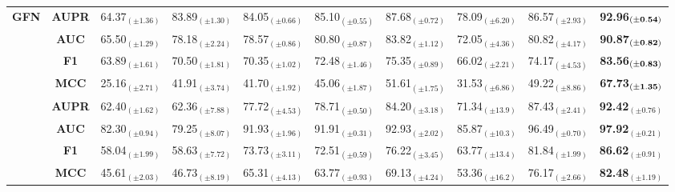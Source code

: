 \begin{table}[ht!]
\begin{tabular*}{\textwidth}{@{\extracolsep{\fill}} l |c | ccccccc | >{\columncolor{FireBrick!40}}c }
 \multirow{4}{*}{\bf GFN} & \bf AUPR & 64.37$_{(\pm1.36)}$ & 83.89$_{(\pm1.30)}$ & 84.05$_{(\pm0.66)}$ & 85.10$_{(\pm0.55)}$ & 87.68$_{(\pm0.72)}$ & 78.09$_{(\pm6.20)}$ & 86.57$_{(\pm2.93)}$ & \bf 92.96$_{(\bf\pm0.54)}$ \\
 & \bf AUC & 65.50$_{(\pm1.29)}$ & 78.18$_{(\pm2.24)}$ & 78.57$_{(\pm0.86)}$ & 80.80$_{(\pm0.87)}$ & 83.82$_{(\pm1.12)}$ & 72.05$_{(\pm4.36)}$ & 80.82$_{(\pm4.17)}$ & \bf 90.87$_{(\bf\pm0.82)}$ \\
 & \bf F1 & 63.89$_{(\pm1.61)}$ & 70.50$_{(\pm1.81)}$ & 70.35$_{(\pm1.02)}$ & 72.48$_{(\pm1.46)}$ & 75.35$_{(\pm0.89)}$ & 66.02$_{(\pm2.21)}$ & 74.17$_{(\pm4.53)}$ & \bf 83.56$_{(\bf\pm0.83)}$ \\
 & \bf MCC & 25.16$_{(\pm2.71)}$ & 41.91$_{(\pm3.74)}$ & 41.70$_{(\pm1.92)}$ & 45.06$_{(\pm1.87)}$ & 51.61$_{(\pm1.75)}$ & 31.53$_{(\pm6.86)}$ & 49.22$_{(\pm8.86)}$ & \bf 67.73$_{(\bf\pm1.35)}$ \\

\addlinespace    
\cmidrule{1-10}


 \multirow{4}{*}{\bf XC} 
 & \bf AUPR & 62.40$_{(\pm1.62)}$ & 62.36$_{(\pm7.88)}$ & 77.72$_{(\pm4.53)}$ & 78.71$_{(\pm0.50)}$ & 84.20$_{(\pm3.18)}$ & 71.34$_{(\pm13.9)}$ & 87.43$_{(\pm2.41)}$ & \bf 92.42$_{(\pm0.76)}$ \\
 & \bf AUC  & 82.30$_{(\pm0.94)}$ & 79.25$_{(\pm8.07)}$ & 91.93$_{(\pm1.96)}$ & 91.91$_{(\pm0.31)}$ & 92.93$_{(\pm2.02)}$ & 85.87$_{(\pm10.3)}$ & 96.49$_{(\pm0.70)}$ & \bf 97.92$_{(\pm0.21)}$ \\
 & \bf F1   & 58.04$_{(\pm1.99)}$ & 58.63$_{(\pm7.72)}$ & 73.73$_{(\pm3.11)}$ & 72.51$_{(\pm0.59)}$ & 76.22$_{(\pm3.45)}$ & 63.77$_{(\pm13.4)}$ & 81.84$_{(\pm1.99)}$ & \bf 86.62$_{(\pm0.91)}$ \\
 & \bf MCC  & 45.61$_{(\pm2.03)}$ & 46.73$_{(\pm8.19)}$ & 65.31$_{(\pm4.13)}$ & 63.77$_{(\pm0.93)}$ & 69.13$_{(\pm4.24)}$ & 53.36$_{(\pm16.2)}$ & 76.17$_{(\pm2.66)}$ & \bf 82.48$_{(\pm1.19)}$ \\

\bottomrule
\end{tabular*}
\end{table}




